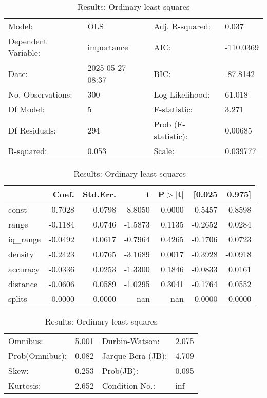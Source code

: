 \begin{table}
\caption{Results: Ordinary least squares}
\label{}
\begin{center}
\begin{tabular}{llll}
\hline
Model:              & OLS              & Adj. R-squared:     & 0.037      \\
Dependent Variable: & importance       & AIC:                & -110.0369  \\
Date:               & 2025-05-27 08:37 & BIC:                & -87.8142   \\
No. Observations:   & 300              & Log-Likelihood:     & 61.018     \\
Df Model:           & 5                & F-statistic:        & 3.271      \\
Df Residuals:       & 294              & Prob (F-statistic): & 0.00685    \\
R-squared:          & 0.053            & Scale:              & 0.039777   \\
\hline
\end{tabular}
\end{center}

\begin{center}
\begin{tabular}{lrrrrrr}
\hline
          &   Coef. & Std.Err. &       t & P$> |$t$|$ &  [0.025 &  0.975]  \\
\hline
const     &  0.7028 &   0.0798 &  8.8050 &      0.0000 &  0.5457 &  0.8598  \\
range     & -0.1184 &   0.0746 & -1.5873 &      0.1135 & -0.2652 &  0.0284  \\
iq\_range & -0.0492 &   0.0617 & -0.7964 &      0.4265 & -0.1706 &  0.0723  \\
density   & -0.2423 &   0.0765 & -3.1689 &      0.0017 & -0.3928 & -0.0918  \\
accuracy  & -0.0336 &   0.0253 & -1.3300 &      0.1846 & -0.0833 &  0.0161  \\
distance  & -0.0606 &   0.0589 & -1.0295 &      0.3041 & -0.1764 &  0.0552  \\
splits    &  0.0000 &   0.0000 &     nan &         nan &  0.0000 &  0.0000  \\
\hline
\end{tabular}
\end{center}

\begin{center}
\begin{tabular}{llll}
\hline
Omnibus:       & 5.001 & Durbin-Watson:    & 2.075  \\
Prob(Omnibus): & 0.082 & Jarque-Bera (JB): & 4.709  \\
Skew:          & 0.253 & Prob(JB):         & 0.095  \\
Kurtosis:      & 2.652 & Condition No.:    & inf    \\
\hline
\end{tabular}
\end{center}
\end{table}
